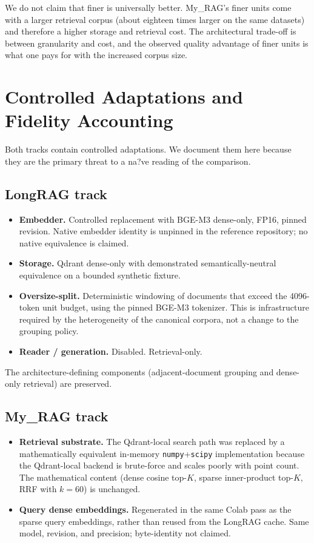 \documentclass[11pt,a4paper]{article}
\begin{document}
We do not claim that finer is universally better. My\_RAG's finer
units come with a larger retrieval corpus (about eighteen times
larger on the same datasets) and therefore a higher storage and
retrieval cost. The architectural trade-off is between granularity
and cost, and the observed quality advantage of finer units is what
one pays for with the increased corpus size.

\section{Controlled Adaptations and Fidelity Accounting}\label{sec:adapt}

Both tracks contain controlled adaptations. We document them here
because they are the primary threat to a na?ve reading of the
comparison.

\subsection{LongRAG track}
\begin{itemize}[leftmargin=1.5em,itemsep=0.15em]
  \item \textbf{Embedder.} Controlled replacement with BGE-M3
    dense-only, FP16, pinned revision. Native embedder identity is
    unpinned in the reference repository; no native equivalence is
    claimed.
  \item \textbf{Storage.} Qdrant dense-only with demonstrated
    semantically-neutral equivalence on a bounded synthetic
    fixture.
  \item \textbf{Oversize-split.} Deterministic windowing of
    documents that exceed the \SI{4096}{}-token unit budget, using
    the pinned BGE-M3 tokenizer. This is infrastructure required by
    the heterogeneity of the canonical corpora, not a change to the
    grouping policy.
  \item \textbf{Reader / generation.} Disabled. Retrieval-only.
\end{itemize}

The architecture-defining components (adjacent-document grouping
and dense-only retrieval) are preserved.

\subsection{My\_RAG track}
\begin{itemize}[leftmargin=1.5em,itemsep=0.15em]
  \item \textbf{Retrieval substrate.} The Qdrant-local search path
    was replaced by a mathematically equivalent in-memory
    \texttt{numpy}+\texttt{scipy} implementation because the
    Qdrant-local backend is brute-force and scales poorly with
    point count. The mathematical content (dense cosine top-$K$,
    sparse inner-product top-$K$, RRF with $k=60$) is unchanged.
  \item \textbf{Query dense embeddings.} Regenerated in the same
    Colab pass as the sparse query embeddings, rather than reused
    from the LongRAG cache. Same model, revision, and precision;
    byte-identity not claimed.
\end{itemize}
\end{document}
